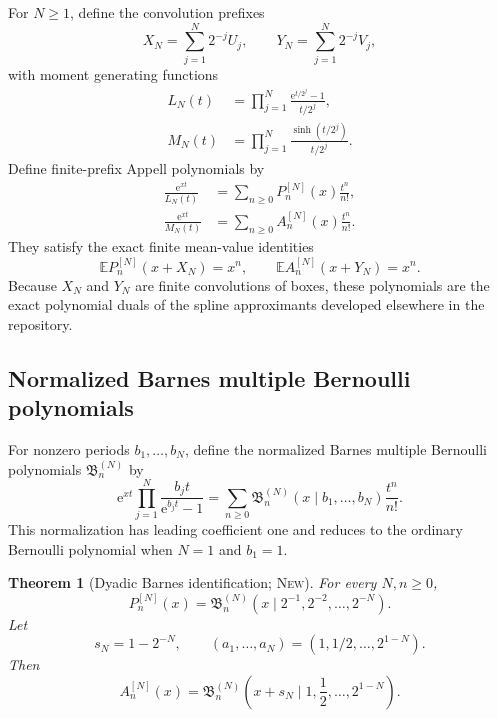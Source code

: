 \documentclass[11pt,oneside]{article}
\theoremstyle{frontier}
\newtheorem{theorem}{Theorem}[section]
\theoremstyle{definition}
\theoremstyle{remark}
\newcommand{\e}{\mathrm e}
\newcommand{\statusnew}{\textsc{New}}
\begin{document}
For $N\ge1$, define the convolution prefixes
\begin{equation}
 X_N=\sum_{j=1}^{N}2^{-j}U_j,
 \qquad
 Y_N=\sum_{j=1}^{N}2^{-j}V_j,
 \label{eq:finite-XY}
\end{equation}
with moment generating functions
\begin{align}
 L_N(t)&=\prod_{j=1}^{N}\frac{\e^{t/2^j}-1}{t/2^j},
 \label{eq:LN}\\
 M_N(t)&=\prod_{j=1}^{N}\frac{\sinh(t/2^j)}{t/2^j}.
 \label{eq:MN}
\end{align}
Define finite-prefix Appell polynomials by
\begin{align}
 \frac{\e^{xt}}{L_N(t)}
 &=\sum_{n\ge0}P_n^{[N]}(x)\frac{t^n}{n!},
 \label{eq:PN-generating}\\
 \frac{\e^{xt}}{M_N(t)}
 &=\sum_{n\ge0}A_n^{[N]}(x)\frac{t^n}{n!}.
 \label{eq:AN-generating}
\end{align}
They satisfy the exact finite mean-value identities
\begin{equation}
 \mathbb E P_n^{[N]}(x+X_N)=x^n,
 \qquad
 \mathbb E A_n^{[N]}(x+Y_N)=x^n.
 \label{eq:finite-mean-value}
\end{equation}
Because $X_N$ and $Y_N$ are finite convolutions of boxes, these polynomials are the exact
polynomial duals of the spline approximants developed elsewhere in the repository.

\subsection{Normalized Barnes multiple Bernoulli polynomials}

For nonzero periods $b_1,\ldots,b_N$, define the normalized Barnes multiple Bernoulli polynomials
$\mathfrak B_n^{(N)}$ by
\begin{equation}
 \e^{xt}\prod_{j=1}^{N}\frac{b_jt}{\e^{b_jt}-1}
 =\sum_{n\ge0}
 \mathfrak B_n^{(N)}(x\mid b_1,\ldots,b_N)\frac{t^n}{n!}.
 \label{eq:Barnes-def}
\end{equation}
This normalization has leading coefficient one and reduces to the ordinary Bernoulli polynomial
when $N=1$ and $b_1=1$.

\begin{theorem}[Dyadic Barnes identification; \statusnew]
\label{thm:Barnes-identification}
For every $N,n\ge0$,
\begin{equation}
 \boxed{
 P_n^{[N]}(x)
 =\mathfrak B_n^{(N)}
 \left(x\mid 2^{-1},2^{-2},\ldots,2^{-N}\right).
 }
 \label{eq:P-Barnes}
\end{equation}
Let
\begin{equation}
 s_N=1-2^{-N},
 \qquad
 (a_1,\ldots,a_N)=(1,1/2,\ldots,2^{1-N}).
 \label{eq:a-sN}
\end{equation}
Then
\begin{equation}
 \boxed{
 A_n^{[N]}(x)
 =\mathfrak B_n^{(N)}
 \left(x+s_N\mid1,\frac12,\ldots,2^{1-N}\right).
 }
 \label{eq:A-Barnes}
\end{equation}
\end{theorem}
\end{document}
